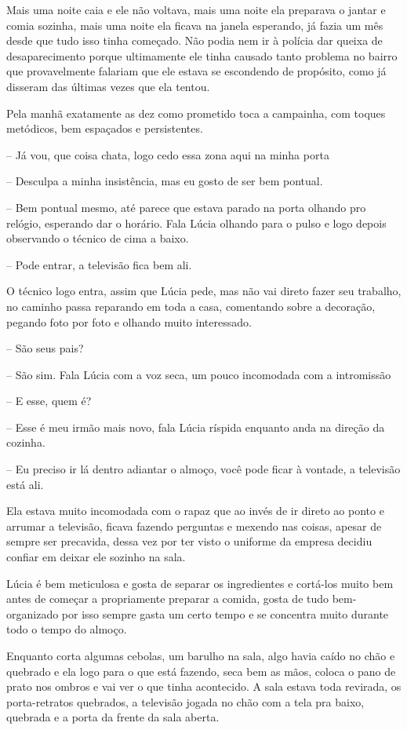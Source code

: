 Mais uma noite caia e ele não voltava, mais uma noite ela preparava o jantar e comia sozinha, mais uma noite ela ficava na janela esperando, já fazia um mês desde que tudo isso tinha começado. Não podia nem ir à polícia dar queixa de desaparecimento porque ultimamente ele tinha causado tanto problema no bairro que provavelmente falariam que ele estava se escondendo de propósito, como já disseram das últimas vezes que ela tentou.

Pela manhã exatamente as dez como prometido toca a campainha, com toques metódicos, bem espaçados e persistentes.

-- Já vou, que coisa chata, logo cedo essa zona aqui na minha porta

-- Desculpa a minha insistência, mas eu gosto de ser bem pontual.

-- Bem pontual mesmo, até parece que estava parado na porta olhando pro relógio, esperando dar o horário. Fala Lúcia olhando para o pulso e logo depois observando o técnico de cima a baixo.

-- Pode entrar, a televisão fica bem ali.

O técnico logo entra, assim que Lúcia pede, mas não vai direto fazer seu trabalho, no caminho passa reparando em toda a casa, comentando sobre a decoração, pegando foto por foto e olhando muito interessado.

-- São seus pais?

-- São sim. Fala Lúcia com a voz seca, um pouco incomodada com a intromissão

-- E esse, quem é?

-- Esse é meu irmão mais novo, fala Lúcia ríspida enquanto anda na direção da cozinha.

-- Eu preciso ir lá dentro adiantar o almoço, você pode ficar à vontade, a televisão está ali.

Ela estava muito incomodada com o rapaz que ao invés de ir direto ao ponto e arrumar a televisão, ficava fazendo perguntas e mexendo nas coisas, apesar de sempre ser precavida, dessa vez por ter visto o uniforme da empresa decidiu confiar em deixar ele sozinho na sala. 

Lúcia é bem meticulosa e gosta de separar os ingredientes e cortá-los muito bem antes de começar a propriamente preparar a comida, gosta de tudo bem-organizado por isso sempre gasta um certo tempo e se concentra muito durante todo o tempo do almoço.

Enquanto corta algumas cebolas, um barulho na sala, algo havia caído no chão e quebrado e ela logo para o que está fazendo, seca bem as mãos, coloca o pano de prato nos ombros e vai ver o que tinha acontecido. A sala estava toda revirada, os porta-retratos quebrados, a televisão jogada no chão com a tela pra baixo, quebrada e a porta da frente da sala aberta.

